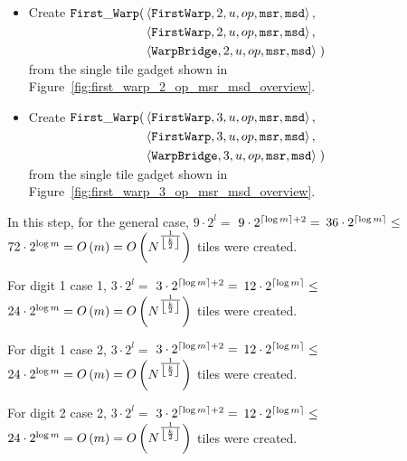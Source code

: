 \begin{itemize}
\begin{itemize}
        \item Create
        $\begin{aligned}[t]
            \firstwarp(& \left\langle {\tt FirstWarp},  2, u, \inc, {\tt msr}, {\tt msd} \right\rangle, \\ %
                       & \left\langle {\tt FirstWarp},  2, u, \inc, {\tt msr}, {\tt msd} \right\rangle, \\ %
                       & \left\langle {\tt WarpBridge}, 2, u, \inc, {\tt msr}, {\tt msd} \right\rangle \;) %
        \end{aligned}$\\ from the single tile gadget shown in Figure~\ref{fig:first_warp_2_op_msr_msd_overview}.
        \vspace{.5cm}
        \item Create
        $\begin{aligned}[t]
            \firstwarp(& \left\langle {\tt FirstWarp},  3, u, \inc, {\tt msr}, {\tt msd} \right\rangle,\\  %
                       & \left\langle {\tt FirstWarp},  3, u, \inc, {\tt msr}, {\tt msd} \right\rangle,\\  %
                       & \left\langle {\tt WarpBridge}, 3, u, \inc, {\tt msr}, {\tt msd} \right\rangle \;) %
        \end{aligned}$\\ from the single tile gadget shown in Figure~\ref{fig:first_warp_3_op_msr_msd_overview}.
        \vspace{.5cm}
    \end{itemize}
    \vspace{.5cm}

    In this step, for the general case,
    $9 \cdot 2^l =$
    $9 \cdot 2^{\ceil*{{\log m}} + 2} =$
    $36 \cdot 2^{\ceil*{\log m}} \leq$
    $72 \cdot 2^{\log m} = \bigom$ tiles were created.

    For digit 1 case 1,
    $3 \cdot 2^l =$
    $3 \cdot 2^{\ceil*{{\log m}} + 2} =$
    $12 \cdot 2^{\ceil*{\log m}} \leq$
    $24 \cdot 2^{\log m} = \bigom$ tiles were created.

    For digit 1 case 2,
    $3 \cdot 2^l =$
    $3 \cdot 2^{\ceil*{{\log m}} + 2} =$
    $12 \cdot 2^{\ceil*{\log m}} \leq$
    $24 \cdot 2^{\log m} = \bigom$ tiles were created.

    For digit 2 case 2,
    $3 \cdot 2^l =$
    $3 \cdot 2^{\ceil*{{\log m}} + 2} =$
    $12 \cdot 2^{\ceil*{\log m}} \leq$
    $24 \cdot 2^{\log m} = \bigom$ tiles were created.


\end{itemize}
